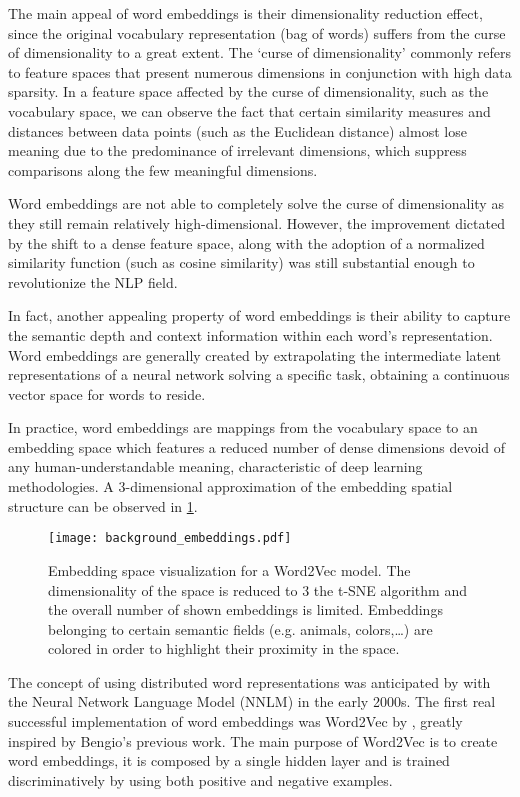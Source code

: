 The main appeal of word embeddings is their dimensionality reduction effect, since the original vocabulary representation (bag of words) suffers from the curse of dimensionality to a great extent.
The `curse of dimensionality' commonly refers to feature spaces that present numerous dimensions in conjunction with high data sparsity.
In a feature space affected by the curse of dimensionality, such as the vocabulary space, we can observe the fact that certain similarity measures and distances between data points (such as the Euclidean distance) almost lose meaning due to the predominance of irrelevant dimensions, which suppress comparisons along the few meaningful dimensions.

Word embeddings are not able to completely solve the curse of dimensionality as they still remain relatively high-dimensional.
However, the improvement dictated by the shift to a dense feature space, along with the adoption of a normalized similarity function (such as cosine similarity) was still substantial enough to revolutionize the NLP field.

In fact, another appealing property of word embeddings is their ability to capture the semantic depth and context information within each word's representation.
Word embeddings are generally created by extrapolating the intermediate latent representations of a neural network solving a specific task, obtaining a continuous vector space for words to reside.

In practice, word embeddings are mappings from the vocabulary space to an embedding space which features a reduced number of dense dimensions devoid of any human-understandable meaning, characteristic of deep learning methodologies.
A $3$-dimensional approximation of the embedding spatial structure can be observed in \cref{fig:background_embeddings}.

\begin{figure}[t!]
    \centering
    \texttt{[image: background\_embeddings.pdf]}
    \caption[Embedding space visualization for a Word2Vec model.]{Embedding space visualization for a Word2Vec model. The dimensionality of the space is reduced to $3$  the t-SNE algorithm and the overall number of shown embeddings is limited. Embeddings belonging to certain semantic fields (e.g. animals, colors,\dots) are colored in order to highlight their proximity in the space.}
    \label{fig:background_embeddings}
\end{figure}

The concept of using distributed word representations was anticipated by \citet{bengio2000} with the Neural Network Language Model (NNLM) in the early 2000s.
The first real successful implementation of word embeddings was Word2Vec by \citet{mikolov2013}, greatly inspired by Bengio's previous work.
The main purpose of Word2Vec is to create word embeddings, it is composed by a single hidden layer and is trained discriminatively by using both positive and negative examples.

